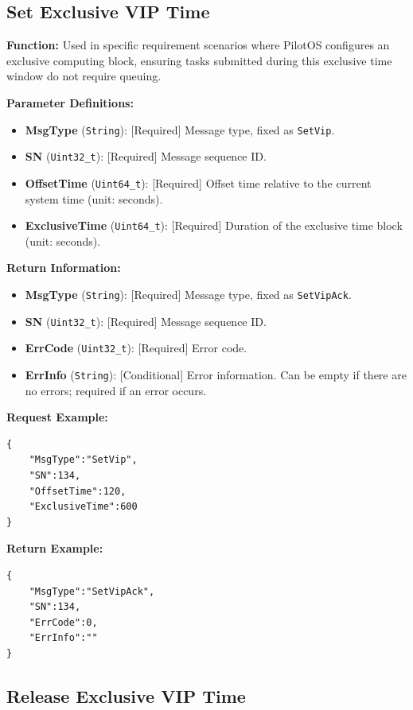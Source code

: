\documentclass[12pt, a4paper]{article}
\begin{document}
\subsection{Set Exclusive VIP Time}

\textbf{Function:} Used in specific requirement scenarios where PilotOS configures an exclusive computing block, ensuring tasks submitted during this exclusive time window do not require queuing.

\textbf{Parameter Definitions:}
\begin{itemize}
    \item \textbf{MsgType} (\texttt{String}): [Required] Message type, fixed as \texttt{SetVip}.
    \item \textbf{SN} (\texttt{Uint32\_t}): [Required] Message sequence ID.
    \item \textbf{OffsetTime} (\texttt{Uint64\_t}): [Required] Offset time relative to the current system time (unit: seconds).
    \item \textbf{ExclusiveTime} (\texttt{Uint64\_t}): [Required] Duration of the exclusive time block (unit: seconds).
\end{itemize}

\textbf{Return Information:}
\begin{itemize}
    \item \textbf{MsgType} (\texttt{String}): [Required] Message type, fixed as \texttt{SetVipAck}.
    \item \textbf{SN} (\texttt{Uint32\_t}): [Required] Message sequence ID.
    \item \textbf{ErrCode} (\texttt{Uint32\_t}): [Required] Error code.
    \item \textbf{ErrInfo} (\texttt{String}): [Conditional] Error information. Can be empty if there are no errors; required if an error occurs.
\end{itemize}

\noindent \textbf{Request Example:}
\begin{lstlisting}
{
    "MsgType":"SetVip",
    "SN":134,
    "OffsetTime":120,
    "ExclusiveTime":600
}
\end{lstlisting}

\noindent \textbf{Return Example:}
\begin{lstlisting}
{
    "MsgType":"SetVipAck",
    "SN":134,
    "ErrCode":0,
    "ErrInfo":""
}
\end{lstlisting}

\subsection{Release Exclusive VIP Time}
\end{document}
